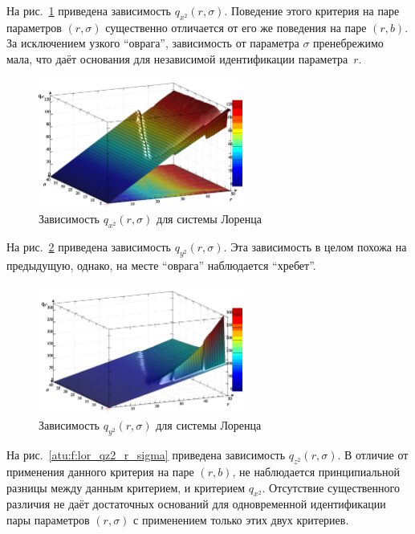 На рис.~\ref{atu:f:lor_qx2_r_sigma} приведена зависимость
$q_{x^2}(r,\sigma)$.
Поведение этого критерия на паре параметров $(r,\sigma)$
существенно отличается от его же поведения на паре $(r,b)$.
За исключением узкого ``оврага'', зависимость от параметра $\sigma$
пренебрежимо мала, что даёт основания для
независимой идентификации параметра~$r$.

\begin{figure}[h!]
  \centerline{  \includegraphics[width=0.60\textwidth]{p/cha/lor/q2d/lor_qx2_r_sigma.png}  }
  \caption{Зависимость $q_{x^2}(r,\sigma)$ для системы Лоренца}
  \label{atu:f:lor_qx2_r_sigma}
\end{figure}


На рис.~\ref{atu:f:lor_qy2_r_sigma} приведена зависимость
$q_{y^2}(r,\sigma)$.
Эта зависимость в целом похожа на предыдущую,
однако, на месте ``оврага'' наблюдается ``хребет''.

\begin{figure}[h!]
  \centerline{  \includegraphics[width=0.60\textwidth]{p/cha/lor/q2d/lor_qy2_r_sigma.png}  }
  \caption{Зависимость $q_{y^2}(r,\sigma)$ для системы Лоренца}
  \label{atu:f:lor_qy2_r_sigma}
\end{figure}

На рис.~\ref{atu:f:lor_qz2_r_sigma} приведена зависимость
$q_{z^2}(r,\sigma)$. В отличие от применения данного
критерия на паре $(r,b)$, не наблюдается принципиальной
разницы между данным критерием, и критерием $q_{x^2}$.
Отсутствие существенного различия не даёт достаточных
оснований для одновременной идентификации
пары параметров $(r,\sigma)$ с применением только этих
двух критериев.

